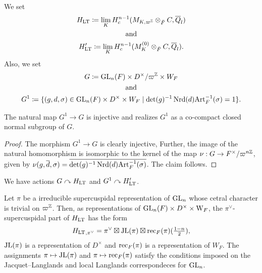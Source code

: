 \documentclass[../main.tex]{subfiles}
\begin{document}
We set 
\begin{equation} \label{eq:DefHLTHprLT}
  \begin{gathered}
  H_{\mathrm{LT}} \coloneqq \lim_K H^{n-1}_c(M_{K, \varpi^{\mathbb{Z}}} \otimes_{\breve F} C, \overline Q_l)
  \\ \text{and} \\
  H_{\mathrm{LT}}' \coloneqq \lim_K H^{n-1}_c(M_{K}^{(0)} \otimes_{\breve F} C, \overline Q_l).
  \end{gathered}
\end{equation}
Also, we set 
\begin{equation}\label{eq:DefGandG1}
\begin{gathered} 
  G \coloneqq \operatorname{GL}_n(F) \times D^\times/\varpi^{\mathbb{Z}} \times W_F \\  \text{ and } \\
  G^1 \coloneqq \{(g,d,\sigma) \in \operatorname{GL}_n(F) \times D^\times \times W_F \mid 
  \det(g)^{-1} \operatorname{Nrd}(d) \mathrm{Art}_F^{-1}(\sigma) = 1\}.
\end{gathered}
\end{equation}
\begin{lem}\label{lem:G1subG}
  The natural map $G^1 \to G$ is injective and realizes $G^1$ as a co-compact closed
  normal subgroup of $G$.
\begin{proof}
  The morphism $G^1 \to G$ is clearly injective, Further, the image of the natural
  homomorphism is isomorphic to the kernel of the map 
  $\nu: G \to F^\times/\varpi^{n\mathbb{Z}}$, given by $\nu(g, \overline d, \sigma) = 
  \overline{\det(g)^{-1}\operatorname{Nrd}(d)\mathrm{Art}_F^{-1}(\sigma)}$. The claim follows.
\end{proof}
\end{lem}

We have actions $G \curvearrowright H_{\mathrm{LT}}$ and $G^1 \curvearrowright H_{\mathrm{LT}}'$. 
\begin{thm}\label{thm:NonAbLTT}
  Let $\pi$ be a irreducible supercuspidal representation of $\operatorname{GL}_n$ whose cetral 
  character is trivial on $\varpi^{\mathbb{Z}}$. Then, as representations of 
  $\operatorname{GL}_n(F) \times D^\times \times \mathrm W_F$, the $\pi^\vee$-supercuspidal part
  of $H_{\mathrm{LT}}$ has the form
  \begin{equation} \label{eq:DefRecJL}
    {H_{\mathrm{LT}}}_{,\pi^\vee} = \pi^\vee \boxtimes \mathrm{JL}(\pi) \boxtimes
                  \mathrm{rec}_F(\pi)(\tfrac {1-n}2),
  \end{equation}
  $\mathrm{JL}(\pi)$ is a representation of $D^\times$ and $\mathrm{rec}_F(\pi)$ is a representation of 
  $W_F$. The assignments $\pi \mapsto \mathrm{JL}(\pi)$ and 
  $\pi \mapsto \mathrm{rec}_F(\pi)$ satisfy the conditions imposed on the 
  Jacquet--Langlands and local Langlands correspondeces for $\operatorname{GL}_n$.
\end{thm}
\end{document}
